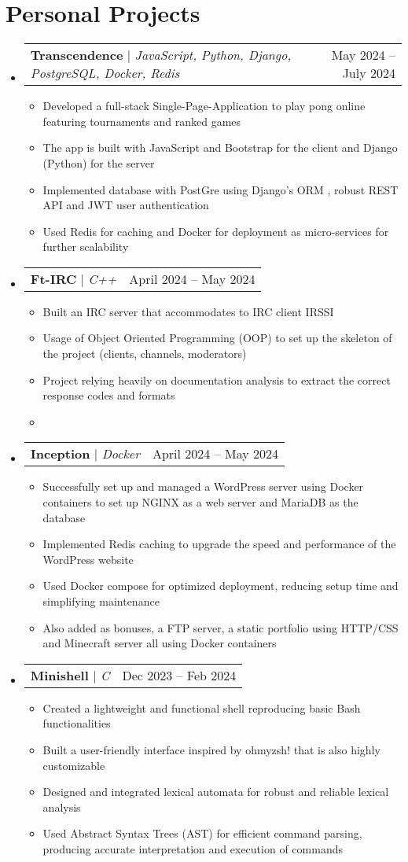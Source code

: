 \documentclass[letterpaper,11pt]{article}
\makeatletter
\newcommand{\resumeItem}[1]{
  \item\small{
    {#1 \vspace{-2pt}}
  }
}
\newcommand{\resumeProjectHeading}[2]{
    \item
    \begin{tabular*}{0.97\textwidth}{l@{\extracolsep{\fill}}r}
      \small#1 & #2 \\
    \end{tabular*}\vspace{-7pt}
}
\newcommand{\resumeSubHeadingListStart}{\begin{itemize}[leftmargin=0.15in, label={}]}
\newcommand{\resumeSubHeadingListEnd}{\end{itemize}}
\newcommand{\resumeItemListStart}{\begin{itemize}}
\newcommand{\resumeItemListEnd}{\end{itemize}\vspace{-5pt}}
\makeatother
\begin{document}

\section{Personal Projects}
    \resumeSubHeadingListStart
        \resumeProjectHeading
          {\textbf{Transcendence} $|$ \emph{JavaScript, Python, Django, PostgreSQL, Docker, Redis}}{May 2024 -- July 2024}
          \resumeItemListStart
            \resumeItem{Developed a full-stack Single-Page-Application to play pong online featuring tournaments and ranked games}
            \resumeItem{The app is built with JavaScript and Bootstrap for the client and Django (Python) for the server}
            \resumeItem{Implemented database with PostGre using Django's ORM , robust REST API and JWT user authentication}
            \resumeItem{Used Redis for caching and Docker for deployment as micro-services for further scalability}
          \resumeItemListEnd
        \resumeProjectHeading
          {\textbf{Ft-IRC} $|$ \emph{C++}}{April 2024 -- May 2024}
          \resumeItemListStart
            \resumeItem{Built an IRC server that accommodates to IRC client IRSSI}
            \resumeItem{Usage of Object Oriented Programming (OOP) to set up the skeleton of the project (clients, channels, moderators)}
            \resumeItem{Project relying heavily on documentation analysis to extract the correct response codes and formats}
            \resumeItem{}
          \resumeItemListEnd
        \resumeProjectHeading
          {\textbf{Inception} $|$ \emph{Docker}}{April 2024 -- May 2024}
          \resumeItemListStart
            \resumeItem{Successfully set up and managed a WordPress server using Docker containers to set up NGINX as a web server and MariaDB as the database}
            \resumeItem{Implemented Redis caching to upgrade the speed and performance of the WordPress website}
            \resumeItem{Used Docker compose for optimized deployment, reducing setup time and simplifying maintenance}
            \resumeItem{Also added as bonuses, a FTP server, a static portfolio using HTTP/CSS and Minecraft server all using Docker containers}
          \resumeItemListEnd
        \resumeProjectHeading
          {\textbf{Minishell} $|$ \emph{C}}{Dec 2023 -- Feb 2024}
          \resumeItemListStart
            \resumeItem{Created a lightweight and functional shell reproducing basic Bash functionalities}
            \resumeItem{Built a user-friendly interface inspired by ohmyzsh! that is also highly customizable}
            \resumeItem{Designed and integrated lexical automata for robust and reliable lexical analysis}
            \resumeItem{Used Abstract Syntax Trees (AST) for efficient command parsing, producing accurate interpretation and execution of commands}
          \resumeItemListEnd
    \resumeSubHeadingListEnd
\end{document}
